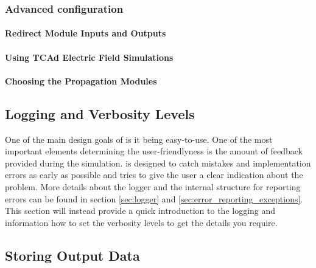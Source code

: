 \subsubsection{Advanced configuration}
\paragraph{Redirect Module Inputs and Outputs}
\wip

\paragraph{Using TCAd Electric Field Simulations}
\wip

\paragraph{Choosing the Propagation Modules}
\wip

\subsection{Logging and Verbosity Levels}
\label{sec:logging_verbosity}
One of the main design goals of \apsq is it being easy-to-use. One of the most important elements determining the user-friendlyness is the amount of feedback provided during the simulation. \apsq is designed to catch mistakes and implementation errors as early as possible and tries to give the user a clear indication about the problem. More details about the logger and the internal structure for reporting errors can be found in section \ref{sec:logger} and \ref{sec:error_reporting_exceptions}. This section will instead provide a quick introduction to the logging and information how to set the verbosity levels to get the details you require.


\subsection{Storing Output Data}
\wip
